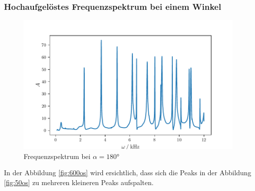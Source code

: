 \subsubsection{Hochaufgelöstes Frequenzspektrum bei einem Winkel}
\begin{figure}
    \centering
    \includegraphics{build/hangle.pdf}
    \caption{Frequenzspektrum bei $\alpha = \ang{180}$}
    \label{fig:hangle}
\end{figure}
\FloatBarrier
In der Abbildung \ref{fig:600os} wird ersichtlich, dass sich die Peaks in der Abbildung \ref{fig:50os} zu mehreren kleineren Peaks aufspalten.

